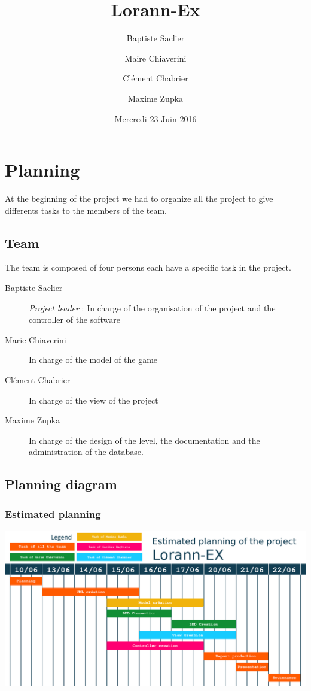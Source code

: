 \documentclass{report}
\title{Lorann-Ex}
\author{Baptiste Saclier\and Maire Chiaverini\and Clément Chabrier\and Maxime Zupka}
\date{Mercredi 23 Juin 2016}
\begin{document}
\maketitle

\tableofcontents
\clearpage

\chapter{Planning}

At the beginning of the project we had to organize all the project to give differents tasks to the members of the team.

\section{Team}

The team is composed of four persons each have a specific task in the project.

\begin{description}
\item[Baptiste Saclier] \emph{Project leader} : In charge of the organisation of the project and the controller of the software
\item[Marie Chiaverini] In charge of the model of the game
\item[Clément Chabrier] In charge of the view of the project
\item[Maxime Zupka] In charge of the design of the level, the documentation and the administration of the database.
\end{description}

\section{Planning diagram}

\subsection{Estimated planning}

\begin{center}
\includegraphics[scale=0.75]{resources/Planning-previsionnel.png}
\end{center}
\end{document}
